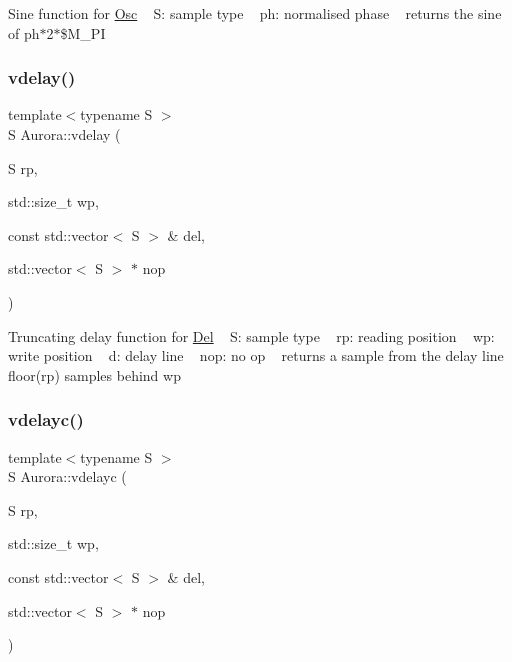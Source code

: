 Sine function for \hyperlink{class_aurora_1_1_osc}{Osc} ~\newline
S\+: sample type ~\newline
ph\+: normalised phase ~\newline
returns the sine of ph$\ast$2$\ast$\$\+M\+\_\+\+PI \mbox{\label{namespace_aurora_a384371636fb98d2845ddc7619acefd0b}} 
\subsubsection{\texorpdfstring{vdelay()}{vdelay()}}
{\footnotesize\ttfamily template$<$typename S $>$ \\
S Aurora\+::vdelay (\begin{DoxyParamCaption}\item[{S}]{rp,  }\item[{std\+::size\+\_\+t}]{wp,  }\item[{const std\+::vector$<$ S $>$ \&}]{del,  }\item[{std\+::vector$<$ S $>$ $\ast$}]{nop }\end{DoxyParamCaption})\hspace{0.3cm}{\ttfamily [inline]}}

Truncating delay function for \hyperlink{class_aurora_1_1_del}{Del} ~\newline
S\+: sample type ~\newline
rp\+: reading position ~\newline
wp\+: write position ~\newline
d\+: delay line ~\newline
nop\+: no op ~\newline
returns a sample from the delay line floor(rp) samples behind wp \mbox{\label{namespace_aurora_ae0b6df856278006b4fed4641f8ffe051}} 
\subsubsection{\texorpdfstring{vdelayc()}{vdelayc()}}
{\footnotesize\ttfamily template$<$typename S $>$ \\
S Aurora\+::vdelayc (\begin{DoxyParamCaption}\item[{S}]{rp,  }\item[{std\+::size\+\_\+t}]{wp,  }\item[{const std\+::vector$<$ S $>$ \&}]{del,  }\item[{std\+::vector$<$ S $>$ $\ast$}]{nop }\end{DoxyParamCaption})\hspace{0.3cm}{\ttfamily [inline]}}

